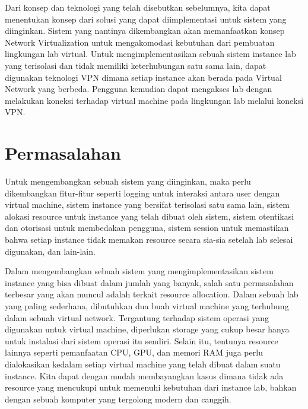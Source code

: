 Dari konsep dan teknologi yang telah disebutkan sebelumnya, kita dapat menentukan konsep dari solusi yang dapat diimplementasi untuk sistem yang diinginkan.
Sistem yang nantinya dikembangkan akan memanfaatkan konsep Network Virtualization untuk mengakomodasi kebutuhan dari pembuatan lingkungan lab virtual.
Untuk mengimplementasikan sebuah sistem instance lab yang terisolasi dan tidak memiliki keterhubungan satu sama lain, 
dapat digunakan teknologi VPN dimana setiap instance akan berada pada Virtual Network yang berbeda.
Pengguna kemudian dapat mengakses lab dengan melakukan koneksi terhadap virtual machine pada lingkungan lab melalui koneksi VPN.
\par


\section{Permasalahan}
\label{sec:masalah}
Untuk mengembangkan sebuah sistem yang diinginkan, maka perlu dikembangkan fitur-fitur seperti logging untuk interaksi antara user dengan virtual machine,
sistem instance yang bersifat terisolasi satu sama lain, sistem alokasi resource untuk instance yang telah dibuat oleh sistem, sistem otentikasi dan otorisasi untuk membedakan pengguna,
sistem session untuk memastikan bahwa setiap instance tidak memakan resource secara sia-sia setelah lab selesai digunakan, dan lain-lain. 


Dalam mengembangkan sebuah sistem yang mengimplementasikan sistem instance yang bisa dibuat dalam jumlah yang banyak,
salah satu permasalahan terbesar yang akan muncul adalah terkait resource allocation.
Dalam sebuah lab yang paling sederhana, dibutuhkan dua buah virtual machine yang terhubung dalam sebuah virtual network.
Tergantung terhadap sistem operasi yang digunakan untuk virtual machine, diperlukan storage yang cukup besar hanya untuk instalasi dari sistem operasi itu sendiri.
Selain itu, tentunya resource lainnya seperti pemanfaatan CPU, GPU, dan memori RAM juga perlu dialokasikan kedalam setiap virtual machine yang telah dibuat dalam suatu instance.
Kita dapat dengan mudah membayangkan kasus dimana tidak ada resource yang mencukupi untuk memenuhi kebutuhan dari instance lab, bahkan dengan sebuah komputer yang tergolong modern dan canggih.
\par
